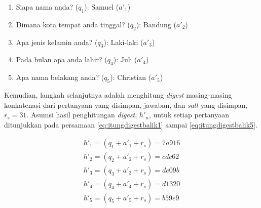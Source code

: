 \begin{enumerate}[itemsep=0mm]
	\item Siapa nama anda? (\begin{math}q_1\end{math}): Samuel (\begin{math}a'_1\end{math})
	\item Dimana kota tempat anda tinggal? (\begin{math}q_2\end{math}): Bandung (\begin{math}a'_2\end{math})
	\item Apa jenis kelamin anda? (\begin{math}q_3\end{math}): Laki-laki (\begin{math}a'_3\end{math})
	\item Pada bulan apa anda lahir? (\begin{math}q_4\end{math}): Juli (\begin{math}a'_4\end{math})
	\item Apa nama belakang anda? (\begin{math}q_5\end{math}): Christian (\begin{math}a'_5\end{math})
\end{enumerate}

Kemudian, langkah selanjutnya adalah menghitung \textit{digest} masing-masing konkatenasi dari pertanyaan yang disimpan, jawaban, dan \textit{salt} yang disimpan, \begin{math}r_s=31\end{math}. Asumsi hasil penghitungan \textit{digest}, \begin{math}h'_n\end{math}, untuk setiap pertanyaan ditunjukkan pada persamaan \ref{eq:itungdigestbalik1} sampai \ref{eq:itungdigestbalik5}.

\begin{gather}
	h'_1 = (q_1 + a'_1 + r_s) = 7a916 \label{eq:itungdigestbalik1} \\
	h'_2 = (q_2 + a'_2 + r_s) = cdc62 \label{eq:itungdigestbalik2} \\
	h'_3 = (q_3 + a'_3 + r_s) = de09b \label{eq:itungdigestbalik3} \\
	h'_4 = (q_4 + a'_4 + r_s) = d1320 \label{eq:itungdigestbalik4} \\
	h'_5 = (q_5 + a'_5 + r_s) = b59e9 \label{eq:itungdigestbalik5}
\end{gather}

